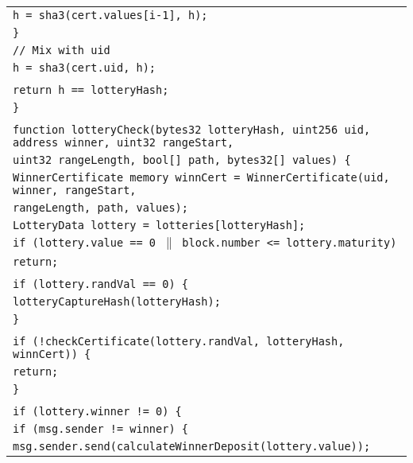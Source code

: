 \documentclass[a4paper]{article}
\begin{document}
\begin{tabularx}{\linewidth}{l}
        \qquad\qquad\qquad\qquad\texttt{h = sha3(cert.values[i-1], h);}\\
        \qquad\qquad\qquad\texttt{\}}\\
        \qquad\qquad\texttt{// Mix with~uid}\\
        \qquad\qquad\texttt{h = sha3(cert.uid, h);}\\
        \\
        \qquad\qquad\texttt{return h == lotteryHash;}\\
        \qquad\texttt{\}}\\
        \\
        \qquad\texttt{function lotteryCheck(bytes32 lotteryHash, uint256 uid, address winner, uint32 rangeStart,}\\
        \qquad\qquad\qquad\qquad\texttt{uint32 rangeLength, bool[] path, bytes32[] values) \{}\\
        \qquad\qquad\texttt{WinnerCertificate memory winnCert = WinnerCertificate(uid, winner, rangeStart,}\\
        \qquad\qquad\qquad\qquad\qquad\qquad\qquad\texttt{rangeLength, path, values);}\\
        \qquad\qquad\texttt{LotteryData lottery = lotteries[lotteryHash];}\\
        \qquad\qquad\texttt{if (lottery.value == 0 $\|$ block.number <= lottery.maturity)}\\
        \qquad\qquad\qquad\texttt{return;}\\
        \\
        \qquad\qquad\texttt{if (lottery.randVal == 0) \{}\\
        \qquad\qquad\qquad\texttt{lotteryCaptureHash(lotteryHash);}\\
        \qquad\qquad\texttt{\}}\\
        \\
        \qquad\qquad\texttt{if (!checkCertificate(lottery.randVal, lotteryHash, winnCert)) \{}\\
        \qquad\qquad\qquad\texttt{return;}\\
        \qquad\qquad\texttt{\}}\\
        \\
        \qquad\qquad\texttt{if (lottery.winner != 0) \{}\\
        \qquad\qquad\qquad\texttt{if (msg.sender != winner) \{}\\
        \qquad\qquad\qquad\qquad\texttt{msg.sender.send(calculateWinnerDeposit(lottery.value));}\\

\end{tabularx}
\end{document}
